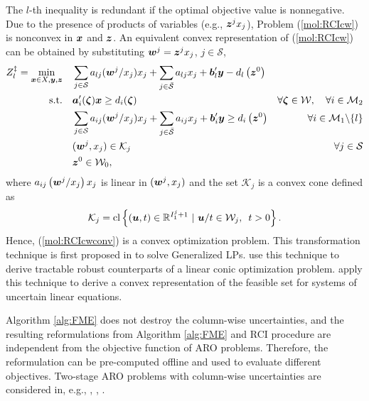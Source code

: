 \documentclass[fleqn,orsc,blindrev]{informs4}
\newcommand{\mb}[1]{\mbox{\boldmath \ensuremath{#1}}}
\begin{document}
		The  $l$-th inequality is redundant if the optimal objective value is nonnegative. Due to the presence of products of variables (e.g., $\mb{z}^j x_j$), Problem (\ref{mol:RCIcw}) is nonconvex in $\mb{x}$ and $\mb{z}$. An equivalent convex representation of (\ref{mol:RCIcw}) can be obtained by substituting $\mb{w}^j= \mb{z}^j x_j$, $j \in \mathcal{S}$,
\begin{equation} \label{mol:RCIcwconv}
			\begin{aligned} 
				Z^\ddag_l =	\min_{ \boldsymbol{x} \in X , \boldsymbol{y}, \boldsymbol{z}} \quad &  \sum_{j\in \mathcal{S}} a_{lj}(\mb{w}^j/x_j)  x_j + \sum_{j\in \bar{\mathcal{S} }} a_{lj} x_j  + \mb{b}'_l \mb{y} - d_l\left(\mb{z}^0\right)  \\
				{\rm s.t.}  \quad &  \mb{a}'_i(\mb{\zeta})\mb{x} \geq d_i(\mb{\zeta}) &  \forall  \mb{\zeta} \in  \mathcal{W}, \quad \forall i  \in \mathcal{M}_2  \\
				\quad &  \sum_{j\in \mathcal{S}} a_{ij}(\mb{w}^j/x_j) x_j + \sum_{j\in \bar{\mathcal{S} }} a_{ij} x_j  +\mb{b}'_i \mb{y} \geq d_i\left(\mb{z}^0\right) &  \forall i  \in \mathcal{M}_1 \backslash \{l\} \\
				\quad & (\mb{w}^j,x_j) \in \mathcal{K}_j & \forall   j \in \mathcal{S}\\
				\quad & \mb{z}^0 \in \mathcal{W}_0,
			\end{aligned}
\end{equation}
		where $a_{ij}\left(\mb{w}^j/x_j\right)x_j$ is linear in  $(\mb{w}^j,x_j)$ and the set $\mathcal{K}_j $ is a convex cone defined as 
\begin{equation*}
		\mathcal{K}_j  = {\rm cl}\left\{ (\mb{u},t) \in \mathbb{R}^{I^j_1+1}~|~ \mb{u}/t \in \mathcal{W}_j, \enskip t>0\right\}. 
\end{equation*}
		Hence, (\ref{mol:RCIcwconv}) is a convex optimization problem. This transformation technique is first proposed in \cite{d63} to solve Generalized LPs. \cite{gbbd14} use this technique to derive tractable robust counterparts of a linear conic optimization problem. \cite{zd17} apply this technique to derive a convex representation of the feasible set for systems of uncertain linear equations.
		
		Algorithm \ref{alg:FME} does not destroy the column-wise uncertainties,  {and the resulting reformulations from Algorithm \ref{alg:FME} and RCI procedure are independent from the objective function of ARO problems. Therefore, the reformulation can be pre-computed offline and used to evaluate different objectives.} Two-stage ARO problems with column-wise uncertainties are considered in, e.g.,  \cite{m11}, \cite{ad16a}, \cite{xb16}. 
		
\end{document}
